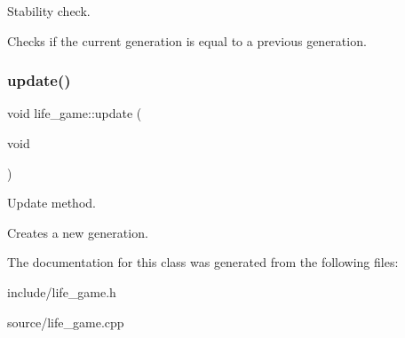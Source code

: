 Stability check. 

Checks if the current generation is equal to a previous generation. \mbox{\label{classlife__game_ad49f74d7d3f981a085ae71b2f85c9447}} 
\subsubsection{\texorpdfstring{update()}{update()}}
{\footnotesize\ttfamily void life\+\_\+game\+::update (\begin{DoxyParamCaption}\item[{void}]{ }\end{DoxyParamCaption})}



Update method. 

Creates a new generation. 

The documentation for this class was generated from the following files\+:\begin{DoxyCompactItemize}
\item 
include/life\+\_\+game.\+h\item 
source/life\+\_\+game.\+cpp\end{DoxyCompactItemize}

